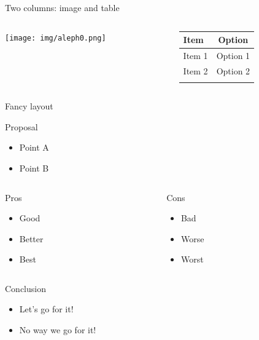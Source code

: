 \documentclass[
  12pt,
  ignorenonframetext,
  aspectratio=169,
  french,
  aspectratio=169]{beamer}
\providecommand{\tightlist}{%
  \setlength{\itemsep}{0pt}\setlength{\parskip}{0pt}}
\begin{document}
\begin{frame}{Two columns: image and table}
\label{two-columns-image-and-table}
\begin{columns}[T]
\begin{column}{0.48\linewidth}
\texttt{[image: img/aleph0.png]}
\end{column}

\begin{column}{0.48\linewidth}
\begin{longtable}[]{@{}lc@{}}
\toprule\noalign{}
\textbf{Item} & \textbf{Option} \\
\midrule\noalign{}
\endhead
Item 1 & Option 1 \\
Item 2 & Option 2 \\
\bottomrule\noalign{}
\end{longtable}
\end{column}
\end{columns}
\end{frame}

\begin{frame}{Fancy layout}
\label{fancy-layout}
\begin{block}{Proposal}
\label{proposal}
\begin{itemize}
\tightlist
\item
  Point A
\item
  Point B
\end{itemize}
\end{block}

\begin{columns}[T]
\begin{column}{0.48\linewidth}
\begin{block}{Pros}
\label{pros}
\begin{itemize}
\tightlist
\item
  Good
\item
  Better
\item
  Best
\end{itemize}
\end{block}
\end{column}

\begin{column}{0.48\linewidth}
\begin{block}{Cons}
\label{cons}
\begin{itemize}
\tightlist
\item
  Bad
\item
  Worse
\item
  Worst
\end{itemize}
\end{block}
\end{column}
\end{columns}

\begin{block}{Conclusion}
\label{conclusion}
\begin{itemize}
\tightlist
\item
  Let's go for it!
\item
  No way we go for it!
\end{itemize}
\end{block}
\end{frame}
\end{document}
